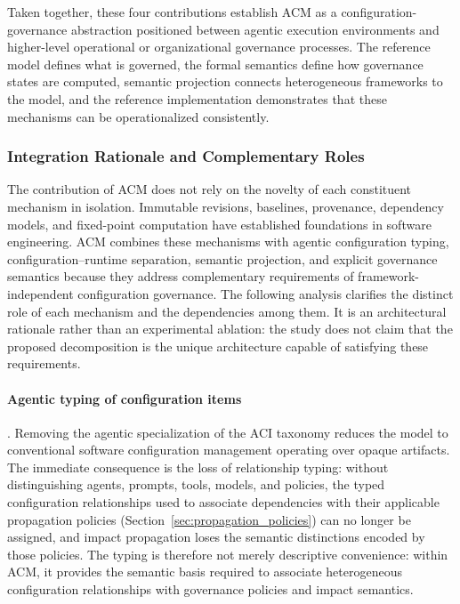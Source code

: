 \documentclass[10pt]{article}
\begin{document}
Taken together, these four contributions establish ACM as a configuration-governance abstraction positioned between agentic execution environments and higher-level operational or organizational governance processes. The reference model defines what is governed, the formal semantics define how governance states are computed, semantic projection connects heterogeneous frameworks to the model, and the reference implementation demonstrates that these mechanisms can be operationalized consistently.

\subsubsection{Integration Rationale and Complementary Roles}
\label{subsec:ablation_mechanism}

The contribution of ACM does not rely on the novelty of each constituent mechanism in isolation. Immutable revisions, baselines, provenance, dependency models, and fixed-point computation have established foundations in software engineering. ACM combines these mechanisms with agentic configuration typing, configuration--runtime separation, semantic projection, and explicit governance semantics because they address complementary requirements of framework-independent configuration governance. The following analysis clarifies the distinct role of each mechanism and the dependencies among them. It is an architectural rationale rather than an experimental ablation: the study does not claim that the proposed decomposition is the unique architecture capable of satisfying these requirements.

\paragraph{Agentic typing of configuration items}. Removing the agentic specialization of the ACI taxonomy reduces the model to conventional software configuration management operating over opaque artifacts. 
The immediate consequence is the loss of relationship typing: without
distinguishing agents, prompts, tools, models, and policies, the typed
configuration relationships used to associate dependencies with their
applicable propagation policies (Section~\ref{sec:propagation_policies}) can no longer be assigned, and impact propagation loses the semantic distinctions encoded by those policies. The typing is therefore not merely descriptive convenience: within ACM, it provides the semantic basis required to associate heterogeneous configuration relationships with governance policies and impact semantics.
\end{document}
